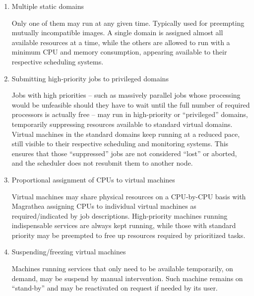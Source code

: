 \documentclass{article}
\begin{document}
\begin{enumerate}
\item Multiple static domains

\medskip

Only one of them may run at any given time. Typically used for preempting mutually incompatible images. A single domain is assigned almost all available resources at a time, while the others are allowed to run with a minimum CPU and memory consumption, appearing available to their respective scheduling systems.

\medskip

\item Submitting high-priority jobs to privileged domains

\medskip

Jobs with high priorities – such as massively parallel jobs whose processing would be unfeasible should they have to wait until the full number of required processors is actually free – may run in high-priority or “privileged” domains, temporarily suppressing resources available to standard virtual domains. Virtual machines in the standard domains keep running at a reduced pace, still visible to their respective scheduling and monitoring systems. This ensures that those “suppressed” jobs are not considered “lost” or aborted, and the scheduler does not resubmit them to another node.

\medskip

\item Proportional assignment of CPUs to virtual machines

\medskip

Virtual machines may share physical resources on a CPU-by-CPU basis with Magrathea assigning CPUs to individual virtual machines as required/indicated by job descriptions. High-priority machines running indispensable services are always kept running, while those with standard priority may be preempted to free up resources required by prioritized tasks.

\medskip

\item Suspending/freezing virtual machines

\medskip

Machines running services that only need to be available temporarily, on demand, may be suspend by manual intervention. Such machine remains on “stand-by” and may be reactivated on request if needed by its user.
\end{enumerate}
\end{document}

